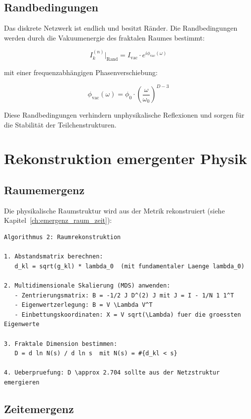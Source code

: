 \subsection{Randbedingungen}
\label{sub:numerik_randbedingungen}

Das diskrete Netzwerk ist endlich und besitzt Ränder. Die Randbedingungen werden durch die Vakuumenergie des fraktalen Raumes bestimmt:

\[
I_k^{(n)} \big|_{\text{Rand}} = I_{\text{vac}} \cdot e^{i\phi_{\text{vac}}(\omega)}
\]

mit einer frequenzabhängigen Phasenverschiebung:

\[
\phi_{\text{vac}}(\omega) = \phi_0 \cdot \left( \frac{\omega}{\omega_0} \right)^{D-3}
\]

Diese Randbedingungen verhindern unphysikalische Reflexionen und sorgen für die Stabilität der Teilchenstrukturen.

\section{Rekonstruktion emergenter Physik}
\label{app:numerik_rekonstruktion}

\subsection{Raumemergenz}
\label{sub:numerik_raum}

Die physikalische Raumstruktur wird aus der Metrik rekonstruiert (siehe Kapitel~\ref{ch:emergenz_raum_zeit}):

\begin{verbatim}
Algorithmus 2: Raumrekonstruktion

1. Abstandsmatrix berechnen:
   d_kl = sqrt(g_kl) * lambda_0  (mit fundamentaler Laenge lambda_0)

2. Multidimensionale Skalierung (MDS) anwenden:
   - Zentrierungsmatrix: B = -1/2 J D^(2) J mit J = I - 1/N 1 1^T
   - Eigenwertzerlegung: B = V \Lambda V^T
   - Einbettungskoordinaten: X = V sqrt(\Lambda) fuer die groessten Eigenwerte

3. Fraktale Dimension bestimmen:
   D = d ln N(s) / d ln s  mit N(s) = #{d_kl < s}

4. Ueberpruefung: D \approx 2.704 sollte aus der Netzstruktur emergieren
\end{verbatim}

\subsection{Zeitemergenz}
\label{sub:numerik_zeit}

